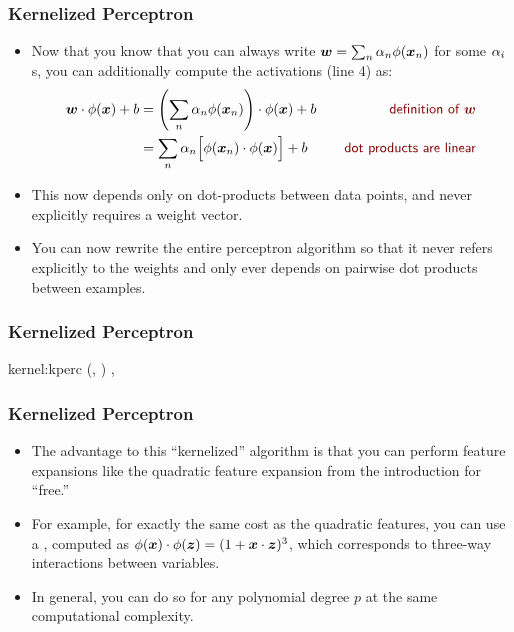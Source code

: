 \documentclass[trans]{beamer}
\begin{document}
\begin{frame}
  \frametitle{Kernelized Perceptron}
\begin{itemize}
\item 
Now that you know that you can always write ${\boldsymbol{w}} = \sum_n \alpha_n
\phi({\boldsymbol{x}}_n)$ for some $\alpha_i$s, you can additionally compute the
activations (line 4) as:
%
\begin{align}
\dotp{\vw}{\phi(\vx)}+b
&= \dotp{\left( \sum_n \al_n \phi(\vx_n) \right)}{\phi(\vx)} + b
\becauseof{definition of $\vw$} \\
&= \sum_n \al_n \Big[ \dotp{\phi(\vx_n)}{\phi(\vx)} \Big] + b
\becauseof{dot products are linear}
\end{align}
%
\item This now depends only on dot-products between data points, and never
explicitly requires a weight vector.
\item  You can now rewrite the entire
perceptron algorithm so that it never refers explicitly to the weights
and only ever depends on pairwise dot products between examples.
\end{itemize}
\end{frame}
\begin{frame}
  \frametitle{Kernelized Perceptron}
\newalgorithm%
  {kernel:kperc}%
  {(, )}
  {
\ENDIF
\ENDFOR
\ENDFOR
\RETURN \VAR{$\vec\al$}, 
}
\end{frame}
\begin{frame}
  \frametitle{Kernelized Perceptron}
\begin{itemize}
\item 
The advantage to this ``kernelized'' algorithm is that you can perform
feature expansions like the quadratic feature expansion from the
introduction for ``free.''
\item  For example, for exactly the same cost as
the quadratic features, you can use a ,
computed as $\phi({\boldsymbol{x}}) \cdot \phi({\boldsymbol{z}}) = (1 + {\boldsymbol{x}} \cdot {\boldsymbol{z}})^3$,
which corresponds to three-way interactions between variables. 
\item In general, you can do so for any polynomial degree $p$ at the same
computational complexity.
\end{itemize}
\end{frame}
\end{document}
